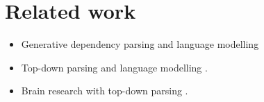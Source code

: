 \section{Related work}
\begin{itemize}
  \item Generative dependency parsing and language modelling \citep{titov2007generative,buys2015bayesian,buys2015generative,buys2018exact}
  \item Top-down parsing and language modelling \citep{Roark2001}.
  \item Brain research with top-down parsing \citep{brennan2016abstract,hale2018beam}.
\end{itemize}
